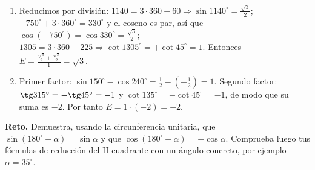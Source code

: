 \documentclass[12pt, letterpaper]{article}
\providecommand{\sen}{\sin}
\begin{document}
\begin{enumerate}[leftmargin=*, label=\textbf{\arabic*.}, start=33]
  \item Reducimos por división: $1140=3\cdot360+60\Rightarrow\sen 1140^\circ=\frac{\sqrt{3}}{2}$; $-750^\circ+3\cdot360^\circ=330^\circ$ y el coseno es par, así que $\cos(-750^\circ)=\cos 330^\circ=\frac{\sqrt{3}}{2}$; $1305=3\cdot360+225\Rightarrow\cot 1305^\circ=+\cot 45^\circ=1$. Entonces $E=\frac{\frac{\sqrt{3}}{2}+\frac{\sqrt{3}}{2}}{1}=\sqrt{3}$.
  \item Primer factor: $\sen 150^\circ-\cos 240^\circ=\frac12-\left(-\frac12\right)=1$. Segundo factor: $\tg 315^\circ=-\tg 45^\circ=-1$ y $\cot 135^\circ=-\cot 45^\circ=-1$, de modo que su suma es $-2$. Por tanto $E=1\cdot(-2)=-2$.
\end{enumerate}

\begin{cuadroextra}
  \small
  \textbf{Reto.} Demuestra, usando la circunferencia unitaria, que
  $\sen(180^\circ-\alpha)=\sen\alpha$ y que
  $\cos(180^\circ-\alpha)=-\cos\alpha$. Comprueba luego tus fórmulas de
  reducción del II cuadrante con un ángulo concreto, por ejemplo
  $\alpha=35^\circ$.
\end{cuadroextra}

\fi
\end{document}
